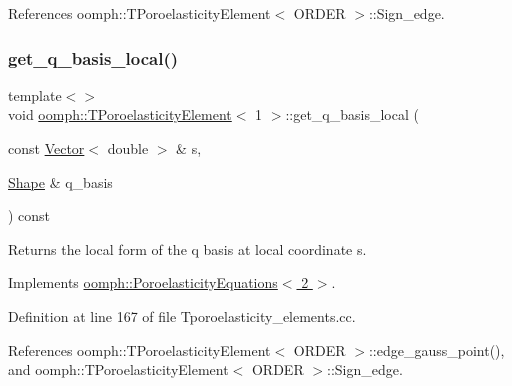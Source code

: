 References oomph\+::\+T\+Poroelasticity\+Element$<$ O\+R\+D\+E\+R $>$\+::\+Sign\+\_\+edge.

\mbox{\label{classoomph_1_1TPoroelasticityElement_a89c64563c231e0a2ec05212c93c0adec}} 
\subsubsection{\texorpdfstring{get\+\_\+q\+\_\+basis\+\_\+local()}{get\_q\_basis\_local()}\hspace{0.1cm}{\footnotesize\ttfamily [2/3]}}
{\footnotesize\ttfamily template$<$$>$ \\
void \hyperlink{classoomph_1_1TPoroelasticityElement}{oomph\+::\+T\+Poroelasticity\+Element}$<$ 1 $>$\+::get\+\_\+q\+\_\+basis\+\_\+local (\begin{DoxyParamCaption}\item[{const \hyperlink{classoomph_1_1Vector}{Vector}$<$ double $>$ \&}]{s,  }\item[{\hyperlink{classoomph_1_1Shape}{Shape} \&}]{q\+\_\+basis }\end{DoxyParamCaption}) const\hspace{0.3cm}{\ttfamily [virtual]}}



Returns the local form of the q basis at local coordinate s. 



Implements \hyperlink{classoomph_1_1PoroelasticityEquations_ab1784901ec76efaefc0a4b3f12cd9078}{oomph\+::\+Poroelasticity\+Equations$<$ 2 $>$}.



Definition at line 167 of file Tporoelasticity\+\_\+elements.\+cc.



References oomph\+::\+T\+Poroelasticity\+Element$<$ O\+R\+D\+E\+R $>$\+::edge\+\_\+gauss\+\_\+point(), and oomph\+::\+T\+Poroelasticity\+Element$<$ O\+R\+D\+E\+R $>$\+::\+Sign\+\_\+edge.

\mbox{\label{classoomph_1_1TPoroelasticityElement_aa432c3fedc655e17ee0e62d6d594eeaa}} 
